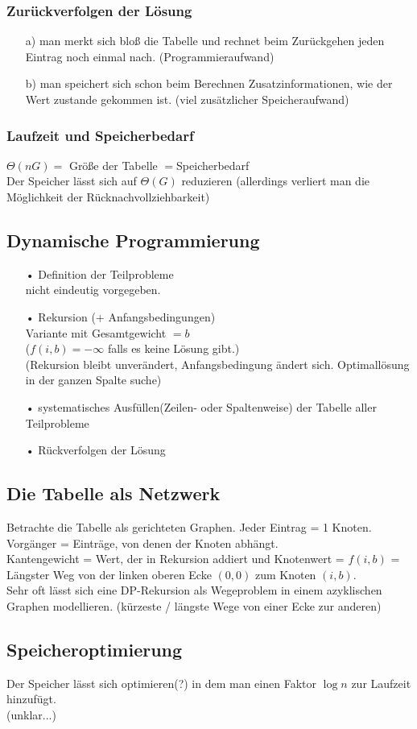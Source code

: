 \subsubsection*{Zurückverfolgen der Lösung}
\begin{enumerate}
\item[a)] man merkt sich bloß die Tabelle und rechnet beim Zurückgehen jeden Eintrag noch einmal nach. (Programmieraufwand)
\item[b)] man speichert sich schon beim Berechnen Zusatzinformationen, wie der Wert zustande gekommen ist. (viel zusätzlicher Speicheraufwand)\\
\end{enumerate} 
\subsubsection{Laufzeit und Speicherbedarf}
$\Theta(nG) = $ Größe der Tabelle $= $Speicherbedarf\\
Der Speicher lässt sich auf $\Theta(G)$ reduzieren (allerdings verliert man die Möglichkeit der Rücknachvollziehbarkeit)  
\subsection{Dynamische Programmierung}
\begin{enumerate}
\item[•] Definition der Teilprobleme\\
nicht eindeutig vorgegeben.\\
\item[•] Rekursion (+ Anfangsbedingungen)\\
Variante mit Gesamtgewicht $=b$\\
($f(i,b) = -\infty$ falls es keine Lösung gibt.)\\
(Rekursion bleibt unverändert, Anfangsbedingung ändert sich. Optimallösung in der ganzen Spalte suche)\\
\item[•] systematisches Ausfüllen(Zeilen- oder Spaltenweise) der Tabelle aller Teilprobleme
\item[•] Rückverfolgen der Lösung
\end{enumerate}
\subsection{Die Tabelle als Netzwerk}
Betrachte die Tabelle als gerichteten Graphen. Jeder Eintrag = 1 Knoten.\\
Vorgänger = Einträge, von denen der Knoten abhängt.\\
Kantengewicht = Wert, der in Rekursion addiert und Knotenwert = $ f(i,b)$ = Längster Weg von der linken oberen Ecke $(0,0)$ zum Knoten $(i,b)$.\\
Sehr oft lässt sich eine DP-Rekursion als Wegeproblem in einem azyklischen Graphen modellieren. (kürzeste / längste Wege von einer Ecke zur anderen)\\
\subsection{Speicheroptimierung}
Der Speicher lässt sich optimieren(?) in dem man einen Faktor $\log n$ zur Laufzeit hinzufügt.\\
(unklar...)